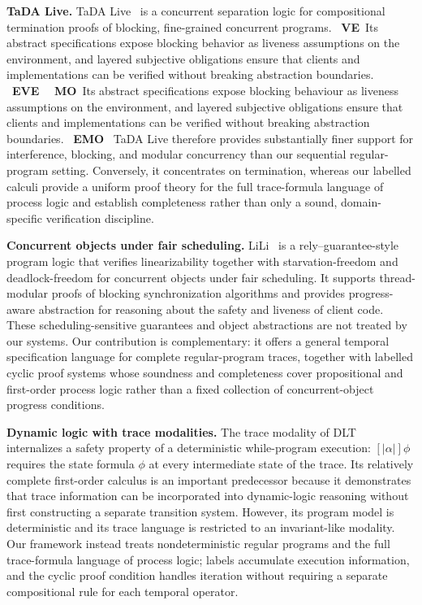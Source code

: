 \documentclass[manuscript,screen]{acmart}
\newcommand{\DLT}[0]{\mbox{DLT}}
\newcommand{\A}[1]{\mbox{ \textbf{#1} }}
\newcommand{\MO}{\A{MO}}
\newcommand{\EMO}{\A{EMO}}
\newcommand{\VE}{\A{VE}}
\newcommand{\EVE}{\A{EVE}}
\begin{document}
\textbf{TaDA Live.}
TaDA Live~\cite{TaDALive21} is a concurrent separation logic for compositional termination proofs of blocking, fine-grained concurrent programs.
\VE Its abstract specifications expose blocking behavior as liveness assumptions on the environment, and layered subjective obligations ensure that clients and implementations can be verified without breaking abstraction boundaries. \EVE
\MO Its abstract specifications expose blocking behaviour as liveness assumptions on the environment, and layered subjective obligations ensure that clients and implementations can be verified without breaking abstraction boundaries. \EMO
TaDA Live therefore provides substantially finer support for interference, blocking, and modular concurrency than our sequential regular-program setting.
Conversely, it concentrates on termination, whereas our labelled calculi provide a uniform proof theory for the full trace-formula language of process logic and establish completeness rather than only a sound, domain-specific verification discipline.

\textbf{Concurrent objects under fair scheduling.}
LiLi~\cite{LiLi16} is a rely--guarantee-style program logic that verifies linearizability together with starvation-freedom and deadlock-freedom for concurrent objects under fair scheduling.
It supports thread-modular proofs of blocking synchronization algorithms and provides progress-aware abstraction for reasoning about the safety and liveness of client code.
These scheduling-sensitive guarantees and object abstractions are not treated by our systems.
Our contribution is complementary: it offers a general temporal specification language for complete regular-program traces, together with labelled cyclic proof systems whose soundness and completeness cover propositional and first-order process logic rather than a fixed collection of concurrent-object progress conditions.
\fi


\ifx
\textbf{Dynamic logic with trace modalities.}
The trace modality of \DLT~\cite{Beckert01} internalizes a safety property of a deterministic while-program execution: $[|\alpha|]\phi$ requires the state formula $\phi$ at every intermediate state of the trace.
Its relatively complete first-order calculus is an important predecessor because it demonstrates that trace information can be incorporated into dynamic-logic reasoning without first constructing a separate transition system.
However, its program model is deterministic and its trace language is restricted to an invariant-like modality.
Our framework instead treats nondeterministic regular programs and the full trace-formula language of process logic; labels accumulate execution information, and the cyclic proof condition handles iteration without requiring a separate compositional rule for each temporal operator.
\end{document}
